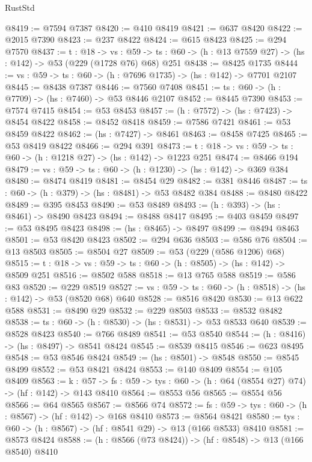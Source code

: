 \begin{lexlean}{RustStd}
\begin{coremodule}
@8419 := @7594 @7387
@8420 := @410 @8419
@8421 := @637 @8420
@8422 := @2015 @7390
@8423 := @237 @8422
@8424 := @615 @8423
@8425 := @294 @7570
@8437 := {t : @18} ->
  {vs : @59} -> {ts : @60} -> (h : @13 @7559 @27) -> (hs : @142) -> @53 (@229 (@1728 @76) @68) @251
@8438 := @8425 @1735
@8444 := {vs : @59} -> {ts : @60} -> (h : @7696 @1735) -> (hs : @142) -> @7701 @2107
@8445 := @8438 @7387
@8446 := @7560 @7408
@8451 := {ts : @60} -> (h : @7709) -> (hs : @7460) -> @53 @8446 @2107
@8452 := @8445 @7390
@8453 := @7574 @7415
@8454 := @53 @8453
@8457 := (h : @7572) -> (hs : @7423) -> @8454 @8422
@8458 := @8452 @8418
@8459 := @7586 @7421
@8461 := @53 @8459 @8422
@8462 := (hs : @7427) -> @8461
@8463 := @8458 @7425
@8465 := @53 @8419 @8422
@8466 := @294 @391
@8473 := {t : @18} -> {vs : @59} -> {ts : @60} -> (h : @1218 @27) -> (hs : @142) -> @1223 @251
@8474 := @8466 @194
@8479 := {vs : @59} -> {ts : @60} -> (h : @1230) -> (hs : @142) -> @369 @384
@8480 := @8474 @8419
@8481 := @8454 @29
@8482 := @381 @8446
@8487 := {ts : @60} -> (h : @379) -> (hs : @8481) -> @53 @8482 @384
@8488 := @8480 @8422
@8489 := @395 @8453
@8490 := @53 @8489
@8493 := (h : @393) -> (hs : @8461) -> @8490 @8423
@8494 := @8488 @8417
@8495 := @403 @8459
@8497 := @53 @8495 @8423
@8498 := (hs : @8465) -> @8497
@8499 := @8494 @8463
@8501 := @53 @8420 @8423
@8502 := @294 @636
@8503 := @586 @76
@8504 := @13 @8503
@8505 := @8504 @27
@8509 := @53 (@229 (@586 @1206) @68)
@8515 := {t : @18} -> {vs : @59} -> {ts : @60} -> (h : @8505) -> (hs : @142) -> @8509 @251
@8516 := @8502 @588
@8518 := @13 @765 @588
@8519 := @586 @83
@8520 := @229 @8519
@8527 := {vs : @59} -> {ts : @60} -> (h : @8518) -> (hs : @142) -> @53 (@8520 @68) @640
@8528 := @8516 @8420
@8530 := @13 @622 @588
@8531 := @8490 @29
@8532 := @229 @8503
@8533 := @8532 @8482
@8538 := {ts : @60} -> (h : @8530) -> (hs : @8531) -> @53 @8533 @640
@8539 := @8528 @8423
@8540 := @766 @8489
@8541 := @53 @8540
@8544 := (h : @8416) -> (hs : @8497) -> @8541 @8424
@8545 := @8539 @8415
@8546 := @623 @8495
@8548 := @53 @8546 @8424
@8549 := (hs : @8501) -> @8548
@8550 := @8545 @8499
@8552 := @53 @8421 @8424
@8553 := @140 @8409
@8554 := @105 @8409
@8563 := {k : @57} ->
  {fs : @59} -> {tys : @60} -> (h : @64 (@8554 @27) @74) -> (hf : @142) -> @143 @8410
@8564 := @8553 @56
@8565 := @8554 @56
@8566 := @64 @8565
@8567 := @8566 @74
@8572 := {fs : @59} -> {tys : @60} -> (h : @8567) -> (hf : @142) -> @168 @8410
@8573 := @8564 @8421
@8580 := {tys : @60} -> (h : @8567) -> (hf : @8541 @29) -> @13 (@166 @8533) @8410
@8581 := @8573 @8424
@8588 := (h : @8566 (@73 @8424)) -> (hf : @8548) -> @13 (@166 @8540) @8410

\end{coremodule}
\end{lexlean}
